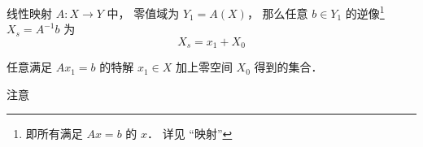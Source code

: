 

\begin{theorem}{}
线性映射 $A:X\to Y$ 中， 零值域为 $Y_1 = A(X)$， 那么任意 $b \in Y_1$ 的逆像\footnote{即所有满足 $Ax = b$ 的 $x$． 详见 “映射”} $X_s = A^{-1}b$ 为
\begin{equation}
X_s = x_1 + X_0
\end{equation}

任意满足 $Ax_1 = b$ 的特解 $x_1 \in X$ 加上零空间 $X_0$ 得到的集合．
\end{theorem}
注意
